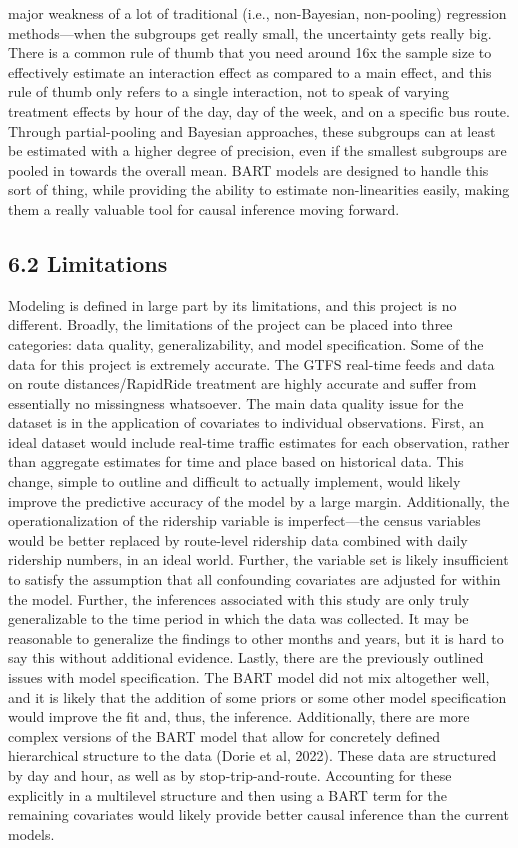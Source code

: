 \documentclass[
  12pt,
]{article}
\begin{document}
major weakness of a lot of traditional (i.e., non-Bayesian, non-pooling)
regression methods---when the subgroups get really small, the
uncertainty gets really big. There is a common rule of thumb that you
need around 16x the sample size to effectively estimate an interaction
effect as compared to a main effect, and this rule of thumb only refers
to a single interaction, not to speak of varying treatment effects by
hour of the day, day of the week, and on a specific bus route. Through
partial-pooling and Bayesian approaches, these subgroups can at least be
estimated with a higher degree of precision, even if the smallest
subgroups are pooled in towards the overall mean. BART models are
designed to handle this sort of thing, while providing the ability to
estimate non-linearities easily, making them a really valuable tool for
causal inference moving forward.

\subsection{6.2 Limitations}\label{limitations}

Modeling is defined in large part by its limitations, and this project
is no different. Broadly, the limitations of the project can be placed
into three categories: data quality, generalizability, and model
specification. Some of the data for this project is extremely accurate.
The GTFS real-time feeds and data on route distances/RapidRide treatment
are highly accurate and suffer from essentially no missingness
whatsoever. The main data quality issue for the dataset is in the
application of covariates to individual observations. First, an ideal
dataset would include real-time traffic estimates for each observation,
rather than aggregate estimates for time and place based on historical
data. This change, simple to outline and difficult to actually
implement, would likely improve the predictive accuracy of the model by
a large margin. Additionally, the operationalization of the ridership
variable is imperfect---the census variables would be better replaced by
route-level ridership data combined with daily ridership numbers, in an
ideal world. Further, the variable set is likely insufficient to satisfy
the assumption that all confounding covariates are adjusted for within
the model. Further, the inferences associated with this study are only
truly generalizable to the time period in which the data was collected.
It may be reasonable to generalize the findings to other months and
years, but it is hard to say this without additional evidence. Lastly,
there are the previously outlined issues with model specification. The
BART model did not mix altogether well, and it is likely that the
addition of some priors or some other model specification would improve
the fit and, thus, the inference. Additionally, there are more complex
versions of the BART model that allow for concretely defined
hierarchical structure to the data (Dorie et al, 2022). These data are
structured by day and hour, as well as by stop-trip-and-route.
Accounting for these explicitly in a multilevel structure and then using
a BART term for the remaining covariates would likely provide better
causal inference than the current models.
\end{document}
